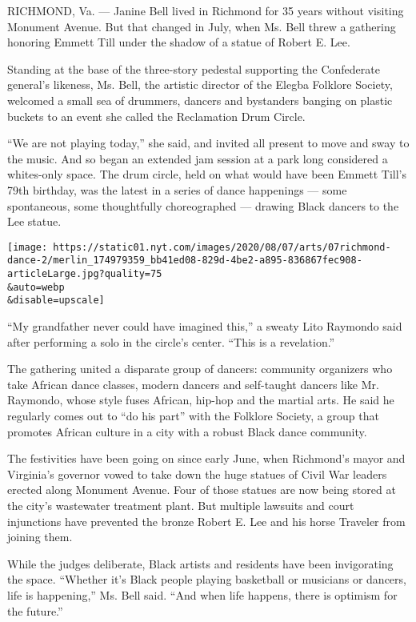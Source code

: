 RICHMOND, Va. --- Janine Bell lived in Richmond for 35 years without
visiting Monument Avenue. But that changed in July, when Ms. Bell threw
a gathering honoring Emmett Till under the shadow of a statue of Robert
E. Lee.

Standing at the base of the three-story pedestal supporting the
Confederate general's likeness, Ms. Bell, the artistic director of the
Elegba Folklore Society, welcomed a small sea of drummers, dancers and
bystanders banging on plastic buckets to an event she called the
Reclamation Drum Circle.

``We are not playing today,'' she said, and invited all present to move
and sway to the music. And so began an extended jam session at a park
long considered a whites-only space. The drum circle, held on what would
have been Emmett Till's 79th birthday, was the latest in a series of
dance happenings --- some spontaneous, some thoughtfully choreographed
--- drawing Black dancers to the Lee statue.

\texttt{[image: https://static01.nyt.com/images/2020/08/07/arts/07richmond-dance-2/merlin\_174979359\_bb41ed08-829d-4be2-a895-836867fec908-articleLarge.jpg?quality=75\\\&auto=webp\\\&disable=upscale]}

``My grandfather never could have imagined this,'' a sweaty Lito
Raymondo said after performing a solo in the circle's center. ``This is
a revelation.''

The gathering united a disparate group of dancers: community organizers
who take African dance classes, modern dancers and self-taught dancers
like Mr. Raymondo, whose style fuses African, hip-hop and the martial
arts. He said he regularly comes out to ``do his part'' with the
Folklore Society, a group that promotes African culture in a city with a
robust Black dance community.

The festivities have been going on since early June, when Richmond's
mayor and Virginia's governor vowed to take down the huge statues of
Civil War leaders erected along Monument Avenue. Four of those statues
are now being stored at the city's wastewater treatment plant. But
multiple lawsuits and court injunctions have prevented the bronze Robert
E. Lee and his horse Traveler from joining them.

While the judges deliberate, Black artists and residents have been
invigorating the space. ``Whether it's Black people playing basketball
or musicians or dancers, life is happening,'' Ms. Bell said. ``And when
life happens, there is optimism for the future.''

